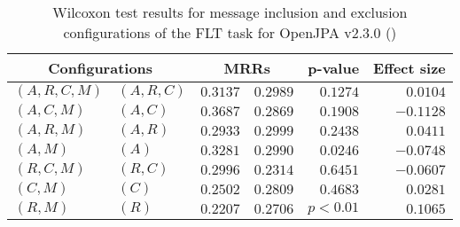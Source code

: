 
\begin{table}
\begin{spacing}{1.2}
\centering
\caption{Wilcoxon test results for message inclusion and exclusion configurations of the FLT task for OpenJPA v2.3.0 (\ctwo)}
\label{table:versus-wilcox-openjpa-flt-message}
\begin{tabular}{ll|rr|rr}
\toprule
      \multicolumn{2}{c|}{Configurations} &                \multicolumn{2}{c|}{MRRs} &             p-value & Effect size \\
\midrule
 $(A,R,C,M)$ &  $(A,R,C)$ &  $\bm{0.3137}$ &       $0.2989$ & $0.1274$ &    $0.0104$ \\
   $(A,C,M)$ &    $(A,C)$ &  $\bm{0.3687}$ &       $0.2869$ & $0.1908$ &   $-0.1128$ \\
   $(A,R,M)$ &    $(A,R)$ &       $0.2933$ &  $\bm{0.2999}$ & $0.2438$ &    $0.0411$ \\
     $(A,M)$ &      $(A)$ &  $\bm{0.3281}$ &       $0.2990$ & $0.0246$ &   $-0.0748$ \\
   $(R,C,M)$ &    $(R,C)$ &  $\bm{0.2996}$ &       $0.2314$ & $0.6451$ &   $-0.0607$ \\
     $(C,M)$ &      $(C)$ &       $0.2502$ &  $\bm{0.2809}$ & $0.4683$ &    $0.0281$ \\
     $(R,M)$ &      $(R)$ &       $0.2207$ &  $\bm{0.2706}$ & $p<0.01$ &    $0.1065$ \\
\bottomrule
\end{tabular}

\end{spacing}
\end{table}

